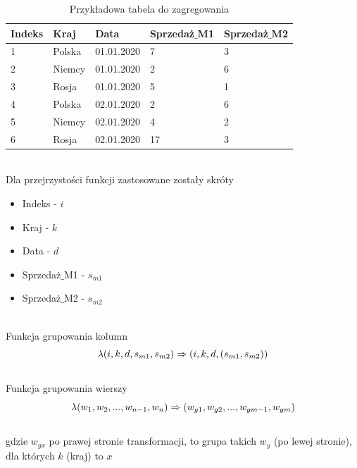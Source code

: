 \documentclass[brudnopis]{xmgr}
\begin{document}
\begin{table}[!tbh]
\begin{tabular}{|l|l|l|l|l|} \hline
Indeks & Kraj & Data & Sprzedaż$\_$M1 & Sprzedaż$\_$M2 \\ \hline
1 & Polska & 01.01.2020 & 7 & 3 \\ \hline
2 & Niemcy & 01.01.2020 & 2 & 6 \\ \hline
3 & Rosja & 01.01.2020 & 5 & 1 \\ \hline
4 & Polska & 02.01.2020 & 2 & 6 \\ \hline
5 & Niemcy & 02.01.2020 & 4 & 2 \\ \hline
6 & Rosja & 02.01.2020 & 17 & 3 \\ \hline
\end{tabular}
\caption{Przykładowa tabela do zagregowania \label{tab:example-input}}
\end{table}
\medskip\\

Dla przejrzystości funkcji zastosowane zostały skróty
\medskip\\

\begin{itemize}
    \item Indeks - $i$
    \item Kraj - $k$
    \item Data - $d$
    \item Sprzedaż$\_$M1 - $s_{m1}$
    \item Sprzedaż$\_$M2 - $s_{m2}$
\end{itemize}
\medskip\\

Funkcja grupowania kolumn
\begin{equation} \label{eq:example-col-agg}
\lambda (i, k, d, s_{m1}, s_{m2}) \\ \Rightarrow (i, k, d, (s_{m1}, s_{m2}))
\end{equation}
\medskip\\

Funkcja grupowania wierszy
\begin{equation} \label{eq:example-row-agg}
\lambda (w_1, w_2, ..., w_{n-1}, w_n) \\ \Rightarrow (w_{g1}, w_{g2}, ..., w_{gm-1}, w_{gm}) 
\end{equation}
\medskip\\

gdzie $w_{gx}$ po prawej stronie transformacji, to grupa takich $w_y$ (po lewej stronie), dla których $k$ (kraj) to $x$
\medskip\\
\end{document}
